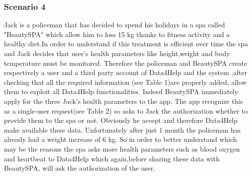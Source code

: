 \subsubsection{Scenario 4}
Jack is a policeman that has decided to spend his holidays in a spa called "BeautySPA" which allow him to loss 15 kg thanks to fitness activity and a healthy diet.In order to understand if this treatment is efficient over time the spa and Jack decides that user's health parameters like height,weight and body temperature must be monitored. Therefore the policeman and BeautySPA create respectively a user and a third party account of Data4Help and the system ,after checking that all the required information (see Table 1)are properly added, allow them to exploit all Data4Help functionalities. Indeed  BeautySPA immediately apply for the three Jack's health parameters to the app. The app recognize this as a single-user request(see Table 2)  so asks to Jack the authorization whether to provide them to the spa or not. Obviously he accept and therefore Data4Help make available these data. Unfortunately after just 1 month the policeman has already had a weight increase of 6 kg. So in order to better understand which may be the reasons the spa asks more health parameters such as blood oxygen and heartbeat to Data4Help which again,before sharing these data with BeautySPA, will ask the authorization of the user.


